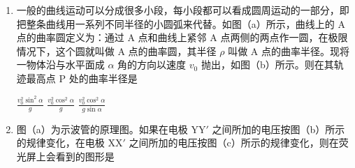 \documentclass[\gkver]{gaokaozhenti}
\begin{document}
\begin{enumerate}
{$\frac{\Delta x(t_{2}-t_{1})}{t_{1}t_{2}(t_{1}+t_{2})}$}
{$\frac{2\Delta x(t_{1}+t_{2})}{t_{1}t_{2}(t_{1}-t_{2})}$}
{$\frac{\Delta x(t_{1}+t_{2})}{t_{1}t_{2}(t_{1}-t_{2})}$}


\item
一般的曲线运动可以分成很多小段，每小段都可以看成圆周运动的一部分，即把整条曲线用一系列不同半径的小圆弧来代替。如图（a）所示，曲线上的 A 点的曲率圆定义为：通过 A 点和曲线上紧邻 A 点两侧的两点作一圆，在极限情况下，这个圆就叫做 A 点的曲率圆，其半径 $\rho$ 叫做 A 点的曲率半径。现将一物体沿与水平面成 $\alpha$ 角的方向以速度 $v_{0}$ 抛出，如图（b）所示。则在其轨迹最高点 P 处的曲率半径是

\onepicture[w=6.00cm]{}

{$\frac{v_{0}^{2}\sin^{2}\alpha}{g}$}
{$\frac{v_{0}^{2}\cos^{2}\alpha}{g}$}
{$\frac{v_{0}^{2}\cos^{2}\alpha}{g\sin\alpha}$}


\item
图（a）为示波管的原理图。如果在电极 YY$'$ 之间所加的电压按图（b）所示的规律变化，在电极 XX$'$ 之间所加的电压按图（c）所示的规律变化，则在荧光屏上会看到的图形是


\end{enumerate}
\end{document}
